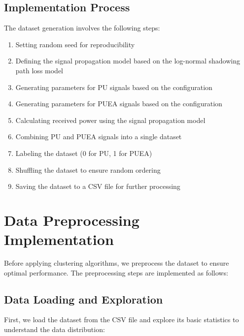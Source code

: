 \subsection{Implementation Process}
The dataset generation involves the following steps:

\begin{enumerate}
    \item Setting random seed for reproducibility
    \item Defining the signal propagation model based on the log-normal shadowing path loss model
    \item Generating parameters for PU signals based on the configuration
    \item Generating parameters for PUEA signals based on the configuration
    \item Calculating received power using the signal propagation model
    \item Combining PU and PUEA signals into a single dataset
    \item Labeling the dataset (0 for PU, 1 for PUEA)
    \item Shuffling the dataset to ensure random ordering
    \item Saving the dataset to a CSV file for further processing
\end{enumerate}

\section{Data Preprocessing Implementation}
Before applying clustering algorithms, we preprocess the dataset to ensure optimal performance. The preprocessing steps are implemented as follows:

\subsection{Data Loading and Exploration}
First, we load the dataset from the CSV file and explore its basic statistics to understand the data distribution:

